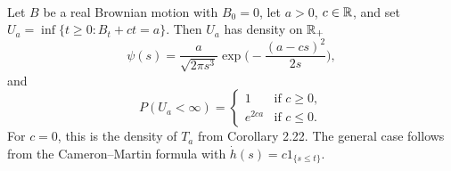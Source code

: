 \begin{proposition}\label{chap5.6:proposition-hitting_time_drift}
\\
Let $B$ be a real Brownian motion with $B_0=0$, let $a>0$, $c\in\mathbb{R}$, and set $U_a=\inf\{t\geq0:B_t+ct=a\}$. Then $U_a$ has density on $\mathbb{R}_+$
$$\psi(s)=\frac{a}{\sqrt{2\pi s^3}}\exp\Big(-\frac{(a-cs)^2}{2s}\Big),$$
and
$$P(U_a<\infty)=\begin{cases}1&\text{if }c\geq0,\\ e^{2ca}&\text{if }c\leq0.\end{cases}$$
For $c=0$, this is the density of $T_a$ from Corollary 2.22. The general case follows from the Cameron--Martin formula with $\dot h(s)=c1_{\{s\leq t\}}$.
\end{proposition}